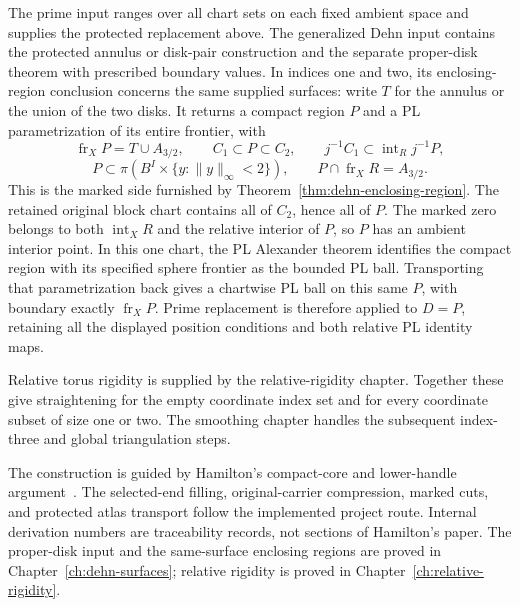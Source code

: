 The prime input ranges over all chart sets on each fixed ambient space
and supplies the protected replacement above. The generalized Dehn input
contains the protected annulus or disk-pair construction and the separate
proper-disk theorem with prescribed boundary values. In indices one and
two, its enclosing-region conclusion concerns the same supplied surfaces:
write $T$ for the annulus or the union of the two disks. It returns a
compact region $P$ and a PL parametrization of its entire frontier, with
\[
 \operatorname{fr}_X P=T\cup A_{3/2},\qquad
 C_1\subset P\subset C_2,\qquad
 j^{-1}C_1\subset\operatorname{int}_R j^{-1}P,
\]
\[
 P\subset\pi(B^I\times\{y:\|y\|_\infty<2\}),\qquad
 P\cap\operatorname{fr}_X R=A_{3/2}.
\]
This is the marked side furnished by
Theorem~\ref{thm:dehn-enclosing-region}. The retained original block chart
contains all of $C_2$, hence all of $P$. The marked zero belongs to both
$\operatorname{int}_X R$ and the relative interior of $P$, so $P$ has an
ambient interior point. In this one chart, the PL Alexander theorem
identifies the compact region with its specified sphere frontier as the
bounded PL ball. Transporting that parametrization back gives a chartwise
PL ball on this same $P$, with boundary exactly $\operatorname{fr}_X P$.
Prime replacement is therefore applied to $D=P$, retaining all the
displayed position conditions and both relative PL identity maps.

Relative torus rigidity is supplied by the relative-rigidity chapter.
Together these give straightening for the empty coordinate index set and for every coordinate
subset of size one or two. The smoothing chapter handles the subsequent
index-three and global triangulation steps.

The construction is guided by Hamilton's compact-core and lower-handle
argument~\cite[Lemma 2, pp.~64--65; pp.~66--68]{Hamilton1976}. The
selected-end filling, original-carrier compression, marked cuts, and
protected atlas transport follow the implemented project route. Internal
derivation numbers are traceability records, not sections of Hamilton's
paper. The proper-disk input and the same-surface enclosing regions are
proved in Chapter~\ref{ch:dehn-surfaces}; relative rigidity is proved in
Chapter~\ref{ch:relative-rigidity}.
